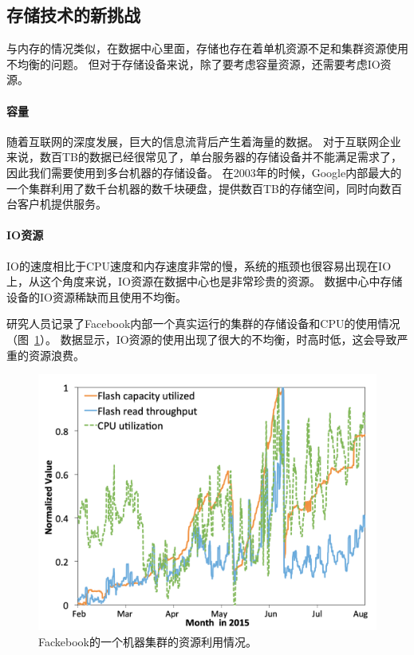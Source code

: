 \subsection{存储技术的新挑战}
与内存的情况类似，在数据中心里面，存储也存在着单机资源不足和集群资源使用不均衡的问题。
但对于存储设备来说，除了要考虑容量资源，还需要考虑IO资源。

\paragraph{容量}
随着互联网的深度发展，巨大的信息流背后产生着海量的数据。
对于互联网企业来说，数百TB的数据已经很常见了，单台服务器的存储设备并不能满足需求了，因此我们需要使用到多台机器的存储设备。
在2003年的时候，Google内部最大的一个集群利用了数千台机器的数千块硬盘，提供数百TB的存储空间，同时向数百台客户机提供服务\cite{gfs}。

\paragraph{IO资源}
IO的速度相比于CPU速度和内存速度非常的慢，系统的瓶颈也很容易出现在IO上，从这个角度来说，IO资源在数据中心也是非常珍贵的资源。
数据中心中存储设备的IO资源稀缺而且使用不均衡。

研究人员记录了Facebook内部一个真实运行的集群的存储设备和CPU的使用情况（图~\ref{fig:facebook_storage_ultilization}）。
数据显示，IO资源的使用出现了很大的不均衡，时高时低，这会导致严重的资源浪费。

\begin{figure}
\centering
\includegraphics[scale=0.4]{Figures/storage/facebook_storage_ultilization.png}
\decoRule
\caption{Fackebook的一个机器集群的资源利用情况\cite{klimovic2016flash}。}
\label{fig:facebook_storage_ultilization}
\end{figure}

